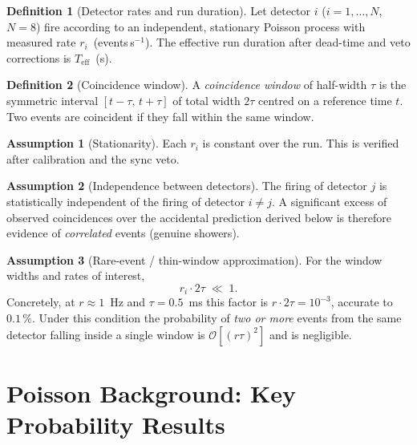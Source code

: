 \documentclass[12pt]{article}
\theoremstyle{definition}
\newtheorem{assumption}{Assumption}
\newtheorem{definition}{Definition}
\newcommand{\Teff}{T_{\!\text{eff}}}
\begin{document}
\begin{definition}[Detector rates and run duration]
Let detector $i$ ($i = 1, \ldots, N$, $N=8$) fire according to an
independent, stationary Poisson process with measured rate
$r_i$~(events\,s$^{-1}$).  The effective run duration after dead-time
and veto corrections is $\Teff$~(s).
\end{definition}

\begin{definition}[Coincidence window]
A \emph{coincidence window} of half-width $\tau$ is the symmetric
interval $[t-\tau,\, t+\tau]$ of total width $2\tau$ centred on a
reference time $t$.  Two events are coincident if they fall within the
same window.
\end{definition}

\begin{assumption}[Stationarity]\label{ass:stat}
Each $r_i$ is constant over the run.  This is verified after calibration
and the sync veto.
\end{assumption}

\begin{assumption}[Independence between detectors]\label{ass:indep}
The firing of detector $j$ is statistically independent of the firing of
detector $i \neq j$.  A significant excess of observed coincidences over
the accidental prediction derived below is therefore evidence of
\emph{correlated} events (genuine showers).
\end{assumption}

\begin{assumption}[Rare-event / thin-window approximation]\label{ass:rare}
For the window widths and rates of interest,
\begin{equation}
    r_i \cdot 2\tau \;\ll\; 1.
    \label{eq:rare}
\end{equation}
Concretely, at $r \approx 1$~Hz and $\tau = 0.5$~ms this factor is
$r \cdot 2\tau = 10^{-3}$, accurate to $0.1\,\%$.  Under this condition
the probability of \emph{two or more} events from the same detector
falling inside a single window is $\mathcal{O}\!\left[(r\tau)^2\right]$
and is negligible.
\end{assumption}

\section{Poisson Background: Key Probability Results}
\end{document}
